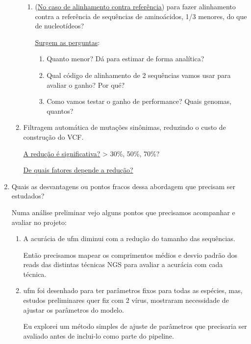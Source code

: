 \documentclass[12pt]{article}
\begin{document}
\begin{enumerate}
\begin{enumerate}
\begin{enumerate}
                        \item (\underline{No caso de alinhamento contra referência}) para fazer alinhamento contra a referência de sequências de aminoácidos, 1/3 menores, do que de nucleotídeos?

                              \underline{Surgem as perguntas}:
                              \begin{enumerate}
                                  \item Quanto menor? Dá para estimar de forma analítica?
                                  \item Qual código de alinhamento de 2 sequências vamos usar para avaliar o ganho? Por qué?
                                  \item Como vamos testar o ganho de performance? Quais genomas, quantos?
                              \end{enumerate}
                    \end{enumerate}
              \item Filtragem automática de mutações sinônimas, reduzindo o custo de construção do VCF.

                    \underline{A redução é significativa?} > 30\%, 50\%, 70\%?

                    \underline{De quais fatores depende a redução?}
          \end{enumerate}

    \item Quais as desvantagens ou pontos fracos dessa abordagem que precisam ser estudados?

          Numa análise preliminar vejo alguns pontos que precisamos acompanhar e avaliar no projeto:
          \begin{enumerate}
              \item A acurácia de \gls{ufm} diminui com a redução do tamanho das sequências.

                    Então precisamos mapear os comprimentos médios e desvio padrão dos reads das distintas técnicas NGS para avaliar a acurácia com cada técnica.

              \item \gls{ufm} foi desenhado para ter parâmetros fixos para todas as espécies, mas, estudos preliminares quer fiz com 2 vírus, mostraram necessidade de ajustar os parâmetros do modelo.

                    Eu explorei um método simples de ajuste de parâmetros que precisaria ser avaliado antes de inclui-lo como parte do pipeline.


\end{enumerate}
\end{enumerate}
\end{document}
